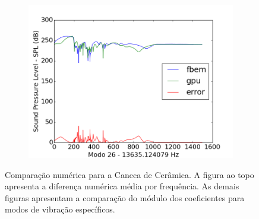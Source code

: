 \begin{figure}[ht]
\begin{subfigure}{0.45\textwidth}
	\includegraphics[width=\textwidth]{../data/transfer_test/ceramic_mug/plots/ceramic_mug-tfv-0_26.png}
	\caption{}
	\label{fig:coef_mug_26}
\end{subfigure}
\caption[Comparação numérica para a Caneca de Cerâmica]{Comparação numérica para a Caneca de Cerâmica. A figura ao topo apresenta a diferença numérica média por frequência. As demais figuras apresentam a comparação do módulo dos coeficientes para modos de vibração específicos.}
\label{fig:coef_mug_diff}
\end{figure}

